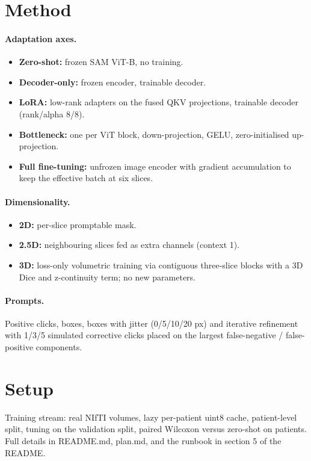 \documentclass{article}
\begin{document}
\section*{Method}

\paragraph{Adaptation axes.}
\begin{itemize}
  \item {\bf Zero-shot:} frozen SAM ViT-B, no training.
  \item {\bf Decoder-only:} frozen encoder, trainable decoder.
  \item {\bf LoRA:} low-rank adapters on the fused QKV projections, trainable decoder
    (rank/alpha 8/8).
  \item {\bf Bottleneck:} one per ViT block, down-projection, GELU, zero-initialised up-projection.
  \item {\bf Full fine-tuning:} unfrozen image encoder with gradient accumulation to keep the
    effective batch at six slices.
\end{itemize}

\paragraph{Dimensionality.}
\begin{itemize}
  \item {\bf 2D:} per-slice promptable mask.
  \item {\bf 2.5D:} neighbouring slices fed as extra channels (context 1).
  \item {\bf 3D:} loss-only volumetric training via contiguous three-slice blocks with a 3D Dice
    and z-continuity term; no new parameters.
\end{itemize}

\paragraph{Prompts.}
Positive clicks, boxes, boxes with jitter (0/5/10/20 px) and iterative refinement with 1/3/5
simulated corrective clicks placed on the largest false-negative / false-positive components.

\section*{Setup}

Training stream: real NIfTI volumes, lazy per-patient uint8 cache, patient-level split,
tuning on the validation split, paired Wilcoxon versus zero-shot on patients. Full details in
README.md, plan.md, and the runbook in section 5 of the README.
\end{document}
